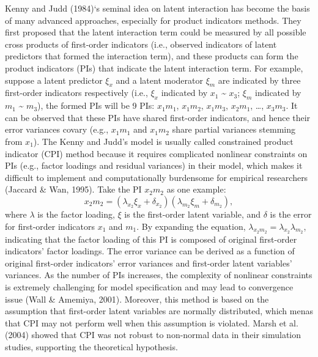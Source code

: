 \documentclass[
  man]{apa7}
\begin{document}
Kenny and Judd (1984)`s seminal idea on latent interaction has become the basis of many advanced approaches, especially for product indicators methods. They first proposed that the latent interaction term could be measured by all possible cross products of first-order indicators (i.e., observed indicators of latent predictors that formed the interaction term), and these products can form the product indicators (PIs) that indicate the latent interaction term. For example, suppose a latent predictor \(\xi_{x}\) and a latent moderator \(\xi_{m}\) are indicated by three first-order indicators respectively (i.e., \(\xi_{x}\) indicated by \(x_{1}\) \textasciitilde{} \(x_{3}\); \(\xi_{m}\) indicated by \(m_{1}\) \textasciitilde{} \(m_{3}\)), the formed PIs will be 9 PIs: \(x_{1}m_{1}\), \(x_{1}m_{2}\), \(x_{1}m_{3}\), \(x_{2}m_{1}\), \ldots, \(x_{3}m_{3}\). It can be observed that these PIs have shared first-order indicators, and hence their error variances covary (e.g., \(x_{1}m_{1}\) and \(x_{1}m_{2}\) share partial variances stemming from \(x_{1}\)). The Kenny and Judd's model is usually called constrained product indicator (CPI) method because it requires complicated nonlinear constraints on PIs (e.g., factor loadings and residual variances) in their model, which makes it difficult to implement and computationally burdensome for empirical researchers (Jaccard \& Wan, 1995). Take the PI \(x_{2}m_{2}\) as one example:
\begin{equation}
x_{2}m_{2}= (\lambda_{x_{2}}\xi_{x} + \delta_{x_{2}})(\lambda_{m_{2}}\xi_{m} + \delta_{m_{2}}),
\end{equation}
where \(\lambda\) is the factor loading, \(\xi\) is the first-order latent variable, and \(\delta\) is the error for first-order indicators \(x_{1}\) and \(m_{1}\). By expanding the equation, \(\lambda_{x_{2}m_{2}} = \lambda_{x_{2}}\lambda_{m_{2}}\), indicating that the factor loading of this PI is composed of original first-order indicators' factor loadings. The error variance can be derived as a function of original first-order indicators' error variances and first-order latent variables' variances. As the number of PIs increases, the complexity of nonlinear constraints is extremely challenging for model specification and may lead to convergence issue (Wall \& Amemiya, 2001). Moreover, this method is based on the assumption that first-order latent variables are normally distributed, which menas that CPI may not perform well when this assumption is violated. Marsh et al. (2004) showed that CPI was not robust to non-normal data in their simulation studies, supporting the theoretical hypothesis.
\end{document}
